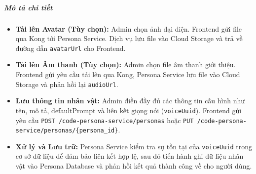 \subparagraph{Mô tả chi tiết}
\begin{itemize}
\item \textbf{Tải lên Avatar (Tùy chọn):} Admin chọn ảnh đại diện. Frontend gửi file qua Kong tới Persona Service. Dịch vụ lưu file vào Cloud Storage và trả về đường dẫn \texttt{avatarUrl} cho Frontend.
\item \textbf{Tải lên Âm thanh (Tùy chọn):} Admin chọn file âm thanh giới thiệu. Frontend gửi yêu cầu tải lên qua Kong, Persona Service lưu file vào Cloud Storage và phản hồi lại \texttt{audioUrl}.
\item \textbf{Lưu thông tin nhân vật:} Admin điền đầy đủ các thông tin cấu hình như tên, mô tả, defaultPrompt và liên kết giọng nói (\texttt{voiceUuid}). Frontend gửi yêu cầu \texttt{POST /code-persona-service/personas} hoặc \texttt{PUT /code-persona-service/personas/\{persona\_id\}}.
\item \textbf{Xử lý và Lưu trữ:} Persona Service kiểm tra sự tồn tại của \texttt{voiceUuid} trong cơ sở dữ liệu để đảm bảo liên kết hợp lệ, sau đó tiến hành ghi dữ liệu nhân vật vào Persona Database và phản hồi kết quả thành công về cho người dùng.
\end{itemize}
